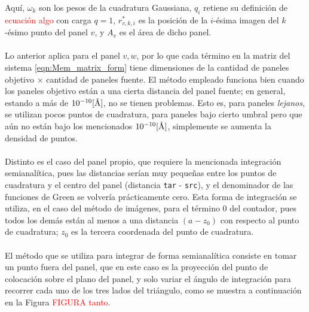 \documentclass[12pt, oneside, numbers, spanish]{ezthesis}
\numberwithin{equation}{section}
\newcommand{\angstrom}{\text{\normalfont\AA}}
\begin{document}
Aquí, $\omega_k$ son los pesos de la cuadratura Gaussiana, $q_i$ retiene su definición de \textcolor{red}{ecuación algo} con carga $q = 1$, $r_{v,k,i}^*$ es la posición de la $i$-ésima imagen del $k$-ésimo punto del panel $v$, y $A_v$ es el área de dicho panel.\\\\
Lo anterior aplica para el panel $v,w$, por lo que cada término en la matriz del sistema \ref{eqn:Mem_matrix_form} tiene dimensiones de la cantidad de paneles objetivo $\times$ cantidad de paneles fuente. El método empleado funciona bien cuando los paneles objetivo están a una cierta distancia del panel fuente; en general, estando a más de $10^{-10} [\angstrom]$, no se tienen problemas. Esto es, para paneles \textit{lejanos}, se utilizan pocos puntos de cuadratura, para paneles bajo cierto umbral pero que aún no están bajo los mencionados $10^{-10} [\angstrom]$, simplemente se aumenta la densidad de puntos.\\\\
Distinto es el caso del panel propio, que requiere la mencionada integración semianalítica, pues las distancias serían muy pequeñas entre los puntos de cuadratura y el centro del panel (distancia \texttt{tar} - \texttt{src}), y el denominador de las funciones de Green se volvería prácticamente cero. Esta forma de integración se utiliza, en el caso del método de imágenes, para el término 0 del contador, pues todos los demás están al menos a una distancia $(a - z_0)$ con respecto al punto de cuadratura; $z_0$ es la tercera coordenada del punto de cuadratura.\\\\
El método que se utiliza para integrar de forma semianalítica consiste en tomar un punto fuera del panel, que en este caso es la proyección del punto de colocación sobre el plano del panel, y solo variar el ángulo de integración para recorrer cada uno de los tres lados del triángulo, como se muestra a continuación en la Figura \textcolor{red}{FIGURA tanto}.

%
\end{document}
